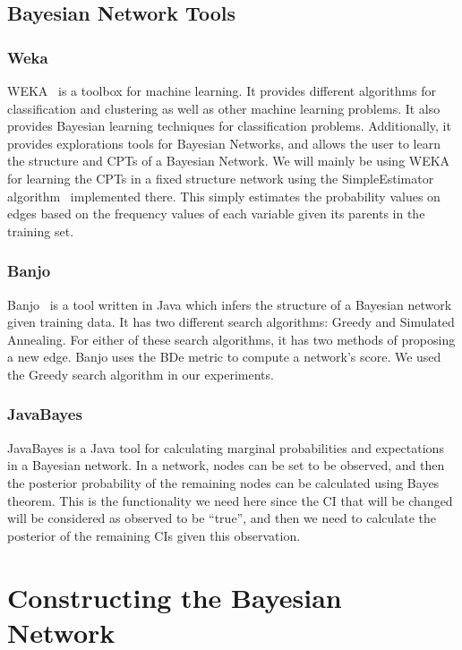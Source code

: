 \documentclass{article}
\begin{document}
\subsection{Bayesian Network Tools}

\subsubsection{Weka}

WEKA~\cite{hall2009weka} is a toolbox for machine learning. It provides different algorithms for classification and clustering as well as other machine
learning problems. It also provides Bayesian learning techniques for classification problems. Additionally, it provides explorations tools for Bayesian
Networks, and allows the user to learn the structure and CPTs of a Bayesian Network. We will mainly be using WEKA for learning the CPTs in a fixed
structure network using the SimpleEstimator algorithm~\cite{witten2005data} implemented there. This simply estimates the probability values on edges based on
the frequency values of each variable given its parents in the training set.

\subsubsection{Banjo}
Banjo~\cite{banjotool} is a tool written in Java which infers the structure of a Bayesian network given training data. It has two different search algorithms:
Greedy and Simulated Annealing. For either of these search algorithms, it has two methods of proposing a new edge. Banjo uses the BDe metric to compute a
network's score. We used the Greedy search algorithm in our experiments.

\subsubsection{JavaBayes}

JavaBayes is a Java tool for calculating marginal probabilities and expectations in a Bayesian network. In a network, nodes can be set to be observed, and then
the posterior probability of the remaining nodes can be calculated using Bayes theorem. This is the functionality we need here since the CI that will be
changed will be considered as observed to be ``true'', and then we need to calculate the posterior of the remaining CIs given this observation.


\section{Constructing the Bayesian Network}
\label{sec:modelsused}
\end{document}
